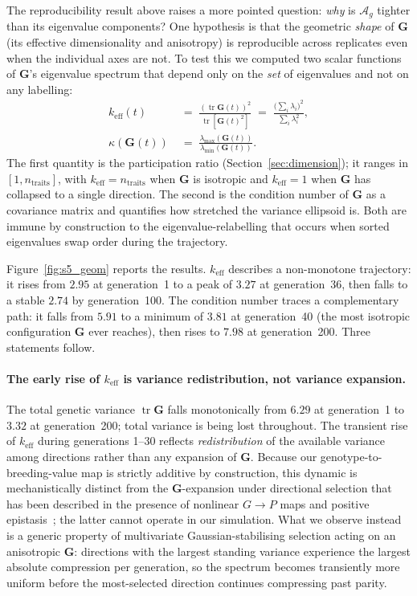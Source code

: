 \documentclass[9pt,twocolumn,twoside,lineno]{gsajnl}
\newcommand{\mat}[1]{\mathbf{#1}}
\newcommand{\tr}{\ensuremath{\operatorname{tr}}\xspace}
\newcommand{\Ag}{\ensuremath{\mathcal{A}_{g}}\xspace}
\newcommand{\keff}{\ensuremath{k_{\mathrm{eff}}}\xspace}
\begin{document}
The reproducibility result above raises a more pointed question: \emph{why} is \Ag tighter than its eigenvalue components? One hypothesis is that the geometric \emph{shape} of $\mat{G}$ (its effective dimensionality and anisotropy) is reproducible across replicates even when the individual axes are not. To test this we computed two scalar functions of $\mat{G}$'s eigenvalue spectrum that depend only on the \emph{set} of eigenvalues and not on any labelling:
\begin{align}
\keff(t) &\;=\; \frac{(\tr\mat{G}(t))^2}{\tr[\mat{G}(t)^2]} \;=\; \frac{\bigl(\sum_i \lambda_i\bigr)^2}{\sum_i \lambda_i^2}, 
\label{eq:s8_keff} \\[2pt]
\kappa(\mat{G}(t)) &\;=\; \frac{\lambda_{\max}(\mat{G}(t))}{\lambda_{\min}(\mat{G}(t))}. 
\label{eq:s8_cond}
\end{align}
The first quantity is the participation ratio (Section~\ref{sec:dimension}); it ranges in $[1, n_{\text{traits}}]$, with $\keff = n_{\text{traits}}$ when $\mat{G}$ is isotropic and $\keff = 1$ when $\mat{G}$ has collapsed to a single direction. The second is the condition number of $\mat{G}$ as a covariance matrix and quantifies how stretched the variance ellipsoid is. Both are immune by construction to the eigenvalue-relabelling that occurs when sorted eigenvalues swap order during the trajectory.

Figure~\ref{fig:s5_geom} reports the results. \keff describes a non-monotone trajectory: it rises from $2.95$ at generation~1 to a peak of $3.27$ at generation~36, then falls to a stable $2.74$ by generation~100. The condition number traces a complementary path: it falls from $5.91$ to a minimum of $3.81$ at generation~40 (the most isotropic configuration $\mat{G}$ ever reaches), then rises to $7.98$ at generation~200. Three statements follow.

\paragraph{The early rise of \keff is variance redistribution, not variance expansion.} 
The total genetic variance $\tr\mat{G}$ falls monotonically from $6.29$ at generation~1 to $3.32$ at generation~200; total variance is being lost throughout. The transient rise of \keff during generations 1--30 reflects \emph{redistribution} of the available variance among directions rather than any expansion of $\mat{G}$. Because our genotype-to-breeding-value map is strictly additive by construction, this dynamic is mechanistically distinct from the $\mat{G}$-expansion under directional selection that has been described in the presence of nonlinear $G\!\to\!P$ maps and positive epistasis~\citep{CarterHermissonHansen2005}; the latter cannot operate in our simulation. What we observe instead is a generic property of multivariate Gaussian-stabilising selection acting on an anisotropic $\mat{G}$: directions with the largest standing variance experience the largest absolute compression per generation, so the spectrum becomes transiently more uniform before the most-selected direction continues compressing past parity.
\end{document}
